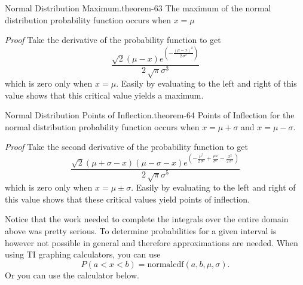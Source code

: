 \documentclass[10pt,]{book}
\makeatletter
\renewcommand*{\proofname}{Proof}
\renewenvironment{proof}[1][\proofname]{\par
  \pushQED{\qed}%
  \normalfont \topsep6\p@\@plus6\p@\relax
  \trivlist
  \item\relax
    {\itshape
    #1\@addpunct{.}}\hspace\labelsep\ignorespaces
}{%
  \popQED\endtrivlist\@endpefalse
}
\numberwithin{equation}{section}
\newcommand{\lt}{<}
\makeatother
\begin{document}
%
\par
\hypertarget{p-1230}{}%
\begin{theorem}{Normal Distribution Maximum.}{}{theorem-63}%
\hypertarget{p-1231}{}%
The maximum of the normal distribution probability function occurs when \(x = \mu\)%
\end{theorem}
\begin{proof}\hypertarget{proof-66}{}
\hypertarget{p-1232}{}%
Take the derivative of the probability function to get%
\begin{equation*}
\frac{\sqrt{2} {\left(\mu - x\right)} e^{\left(-\frac{{\left(\mu - x\right)}^{2}}{2 \, \sigma^{2}}\right)}}{2 \, \sqrt{\pi} \sigma^{3}}
\end{equation*}
which is zero only when \(x = \mu\).  Easily by evaluating to the left and right of this value shows that this critical value yields a maximum.%
\end{proof}
%
\par
\hypertarget{p-1233}{}%
\begin{theorem}{Normal Distribution Points of Inflection.}{}{theorem-64}%
\hypertarget{p-1234}{}%
Points of Inflection for the normal distribution probability function occurs when \(x = \mu + \sigma\) and \(x = \mu - \sigma\).%
\end{theorem}
\begin{proof}\hypertarget{proof-67}{}
\hypertarget{p-1235}{}%
Take the second derivative of the probability function to get%
\begin{equation*}
\frac{\sqrt{2} {\left(\mu + \sigma - x\right)} {\left(\mu - \sigma - x\right)} e^{\left(-\frac{\mu^{2}}{2 \, \sigma^{2}} + \frac{\mu x}{\sigma^{2}} - \frac{x^{2}}{2 \, \sigma^{2}}\right)}}{2 \, \sqrt{\pi} \sigma^{5}}
\end{equation*}
which is zero only when \(x = \mu \pm \sigma\).  Easily by evaluating to the left and right of this value shows that these critical values yield points of inflection.%
\end{proof}
%
\par
\hypertarget{p-1236}{}%
Notice that the work needed to complete the integrals over the entire domain above was pretty serious. To determine probabilities for a given interval is however not possible in general and therefore approximations are needed. When using TI graphing calculators, you can use%
\begin{equation*}
P( a \lt x \lt b ) = \text{normalcdf}(a,b,\mu, \sigma).
\end{equation*}
Or you can use the calculator below.%
\end{document}
